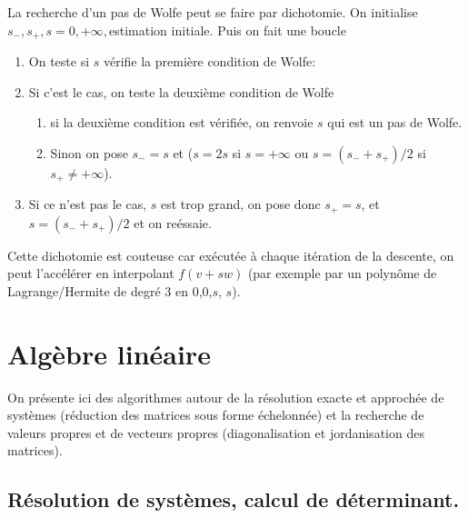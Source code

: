 \documentclass[a4paper,11pt]{article}
\begin{document}
\begin{giacjshere}
La recherche d'un pas de Wolfe peut se faire par dichotomie. On
initialise $s_-,s_+,s=0,+\infty,$estimation initiale. Puis on fait une boucle
\begin{enumerate}
\item On teste si $s$ v\'erifie la premi\`ere condition de Wolfe:
\item Si c'est le cas, on teste la deuxi\`eme condition de Wolfe
\begin{enumerate}
\item si la deuxi\`eme condition est
  v\'erifi\'ee, on renvoie $s$ qui est un pas de Wolfe. 
\item Sinon
on pose $s_-=s$
et ($s=2s$ si $s=+\infty$ ou $s=(s_-+s_+)/2$ si $s_+\neq +\infty$).
\end{enumerate}
\item Si ce n'est pas le cas, $s$ est trop
grand, on pose donc $s_+=s$, et $s=(s_-+s_+)/2$ et on re\'essaie.
\end{enumerate}
Cette dichotomie est couteuse car ex\'ecut\'ee \`a chaque it\'eration
de la descente, on peut l'acc\'el\'erer en interpolant $f(v+sw)$ (par
exemple par un polyn\^ome de Lagrange/Hermite de degr\'e 3 en 0,0,$s$, $s$).

\section{Alg\`ebre lin\'eaire} \label{sec:linalg}
On présente ici des algorithmes autour de la résolution exacte
et approch\'ee de systèmes (réduction des matrices sous forme échelonnée) 
et la recherche de valeurs propres et de vecteurs propres 
(diagonalisation et jordanisation des matrices).

\subsection{R\'esolution de syst\`emes, calcul de d\'eterminant.}


\end{giacjshere}
\end{document}
